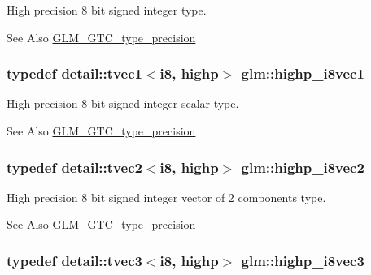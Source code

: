 High precision 8 bit signed integer type. \begin{DoxySeeAlso}{See Also}
\hyperlink{group__gtc__type__precision}{G\-L\-M\-\_\-\-G\-T\-C\-\_\-type\-\_\-precision} 
\end{DoxySeeAlso}
\hypertarget{group__gtc__type__precision_ga0334353753f93388bcc89f91c9aff476}{
\subsubsection[{highp\-\_\-i8vec1}]{\setlength{\rightskip}{0pt plus 5cm}typedef detail\-::tvec1$<$i8, highp$>$ {\bf glm\-::highp\-\_\-i8vec1}}}\label{group__gtc__type__precision_ga0334353753f93388bcc89f91c9aff476}
High precision 8 bit signed integer scalar type. \begin{DoxySeeAlso}{See Also}
\hyperlink{group__gtc__type__precision}{G\-L\-M\-\_\-\-G\-T\-C\-\_\-type\-\_\-precision} 
\end{DoxySeeAlso}
\hypertarget{group__gtc__type__precision_ga2224945795a870e41d951f0847d54f02}{
\subsubsection[{highp\-\_\-i8vec2}]{\setlength{\rightskip}{0pt plus 5cm}typedef detail\-::tvec2$<$i8, highp$>$ {\bf glm\-::highp\-\_\-i8vec2}}}\label{group__gtc__type__precision_ga2224945795a870e41d951f0847d54f02}
High precision 8 bit signed integer vector of 2 components type. \begin{DoxySeeAlso}{See Also}
\hyperlink{group__gtc__type__precision}{G\-L\-M\-\_\-\-G\-T\-C\-\_\-type\-\_\-precision} 
\end{DoxySeeAlso}
\hypertarget{group__gtc__type__precision_gad716792169ce7de963df25b865714438}{
\subsubsection[{highp\-\_\-i8vec3}]{\setlength{\rightskip}{0pt plus 5cm}typedef detail\-::tvec3$<$i8, highp$>$ {\bf glm\-::highp\-\_\-i8vec3}}}\label{group__gtc__type__precision_gad716792169ce7de963df25b865714438}
